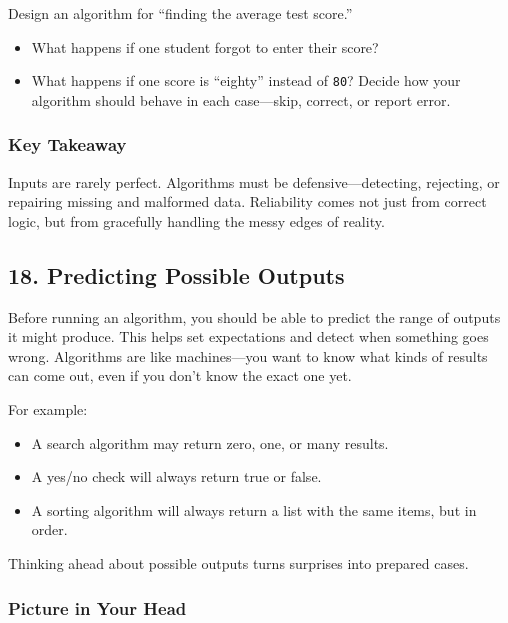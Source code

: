 \documentclass[
  letterpaper,
  DIV=11,
  numbers=noendperiod]{scrreprt}
\providecommand{\tightlist}{%
  \setlength{\itemsep}{0pt}\setlength{\parskip}{0pt}}
\begin{document}
Design an algorithm for ``finding the average test score.''

\begin{itemize}
\tightlist
\item
  What happens if one student forgot to enter their score?
\item
  What happens if one score is ``eighty'' instead of \texttt{80}? Decide
  how your algorithm should behave in each case---skip, correct, or
  report error.
\end{itemize}

\subsubsection{Key Takeaway}\label{key-takeaway-15}

Inputs are rarely perfect. Algorithms must be defensive---detecting,
rejecting, or repairing missing and malformed data. Reliability comes
not just from correct logic, but from gracefully handling the messy
edges of reality.

\subsection{18. Predicting Possible
Outputs}\label{predicting-possible-outputs}

Before running an algorithm, you should be able to predict the range of
outputs it might produce. This helps set expectations and detect when
something goes wrong. Algorithms are like machines---you want to know
what kinds of results can come out, even if you don't know the exact one
yet.

For example:

\begin{itemize}
\tightlist
\item
  A search algorithm may return zero, one, or many results.
\item
  A yes/no check will always return true or false.
\item
  A sorting algorithm will always return a list with the same items, but
  in order.
\end{itemize}

Thinking ahead about possible outputs turns surprises into prepared
cases.

\subsubsection{Picture in Your Head}\label{picture-in-your-head-17}
\end{document}
